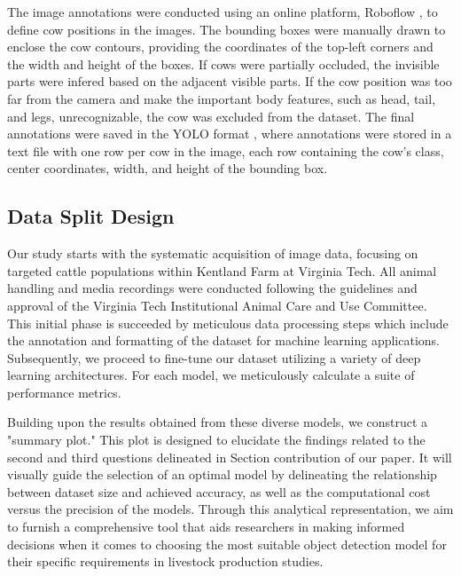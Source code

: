 The image annotations were conducted using an online platform, Roboflow \citep{}, to define cow positions in the images. The bounding boxes were manually drawn to enclose the cow contours, providing the coordinates of the top-left corners and the width and height of the boxes. If cows were partially occluded, the invisible parts were infered based on the adjacent visible parts. If the cow position was too far from the camera and make the important body features, such as head, tail, and legs, unrecognizable, the cow was excluded from the dataset. The final annotations were saved in the YOLO format \citep{}, where annotations were stored in a text file with one row per cow in the image, each row containing the cow's class, center coordinates, width, and height of the bounding box.

\subsection*{Data Split Design}








Our study starts with the systematic acquisition of image data, focusing on targeted cattle populations within Kentland Farm at Virginia Tech. All animal handling and media recordings were conducted following the guidelines and approval of the Virginia Tech Institutional Animal Care and Use Committee. This initial phase is succeeded by meticulous data processing steps which include the annotation and formatting of the dataset for machine learning applications. Subsequently, we proceed to fine-tune our dataset utilizing a variety of deep learning architectures. For each model, we meticulously calculate a suite of performance metrics.

Building upon the results obtained from these diverse models, we construct a "summary plot." This plot is designed to elucidate the findings related to the second and third questions delineated in Section {contribution} of our paper. It will visually guide the selection of an optimal model by delineating the relationship between dataset size and achieved accuracy, as well as the computational cost versus the precision of the models. Through this analytical representation, we aim to furnish a comprehensive tool that aids researchers in making informed decisions when it comes to choosing the most suitable object detection model for their specific requirements in livestock production studies.

